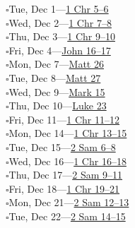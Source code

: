 \hypertarget{rp-2026-12-01}{}\noindent$\square$\enspace Tue, Dec 1\enspace---\enspace \hyperlink{ch-1chronicles-5}{1 Chr 5--6}\\
\hypertarget{rp-2026-12-02}{}\noindent$\square$\enspace Wed, Dec 2\enspace---\enspace \hyperlink{ch-1chronicles-7}{1 Chr 7--8}\\
\hypertarget{rp-2026-12-03}{}\noindent$\square$\enspace Thu, Dec 3\enspace---\enspace \hyperlink{ch-1chronicles-9}{1 Chr 9--10}\\
\hypertarget{rp-2026-12-04}{}\noindent$\square$\enspace Fri, Dec 4\enspace---\enspace \hyperlink{ch-john-16}{John 16--17}\\
\hypertarget{rp-2026-12-07}{}\noindent$\square$\enspace Mon, Dec 7\enspace---\enspace \hyperlink{ch-matthew-26}{Matt 26}\\
\hypertarget{rp-2026-12-08}{}\noindent$\square$\enspace Tue, Dec 8\enspace---\enspace \hyperlink{ch-matthew-27}{Matt 27}\\
\hypertarget{rp-2026-12-09}{}\noindent$\square$\enspace Wed, Dec 9\enspace---\enspace \hyperlink{ch-mark-15}{Mark 15}\\
\hypertarget{rp-2026-12-10}{}\noindent$\square$\enspace Thu, Dec 10\enspace---\enspace \hyperlink{ch-luke-23}{Luke 23}\\
\hypertarget{rp-2026-12-11}{}\noindent$\square$\enspace Fri, Dec 11\enspace---\enspace \hyperlink{ch-1chronicles-11}{1 Chr 11--12}\\
\hypertarget{rp-2026-12-14}{}\noindent$\square$\enspace Mon, Dec 14\enspace---\enspace \hyperlink{ch-1chronicles-13}{1 Chr 13--15}\\
\hypertarget{rp-2026-12-15}{}\noindent$\square$\enspace Tue, Dec 15\enspace---\enspace \hyperlink{ch-2samuel-6}{2 Sam 6--8}\\
\hypertarget{rp-2026-12-16}{}\noindent$\square$\enspace Wed, Dec 16\enspace---\enspace \hyperlink{ch-1chronicles-16}{1 Chr 16--18}\\
\hypertarget{rp-2026-12-17}{}\noindent$\square$\enspace Thu, Dec 17\enspace---\enspace \hyperlink{ch-2samuel-9}{2 Sam 9--11}\\
\hypertarget{rp-2026-12-18}{}\noindent$\square$\enspace Fri, Dec 18\enspace---\enspace \hyperlink{ch-1chronicles-19}{1 Chr 19--21}\\
\hypertarget{rp-2026-12-21}{}\noindent$\square$\enspace Mon, Dec 21\enspace---\enspace \hyperlink{ch-2samuel-12}{2 Sam 12--13}\\
\hypertarget{rp-2026-12-22}{}\noindent$\square$\enspace Tue, Dec 22\enspace---\enspace \hyperlink{ch-2samuel-14}{2 Sam 14--15}\\
